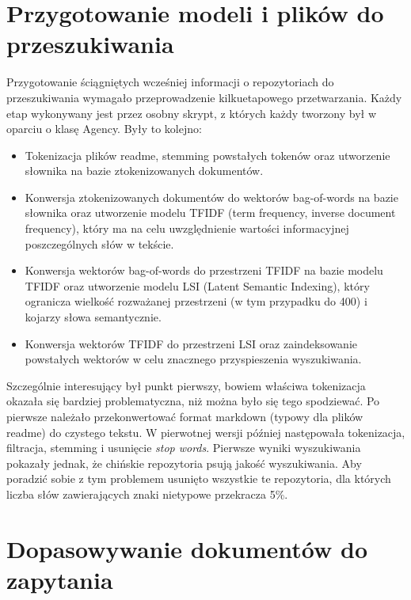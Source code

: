 \documentclass[12pt, oneside, final]{report}
\begin{document}
\section*{Przygotowanie modeli i plików do przeszukiwania}
Przygotowanie ściągniętych wcześniej informacji o repozytoriach do przeszukiwania wymagało przeprowadzenie kilkuetapowego przetwarzania. Każdy etap wykonywany jest przez osobny skrypt, z których każdy tworzony był w oparciu o klasę Agency. Były to kolejno:
\begin{itemize}
	\item{Tokenizacja plików readme, stemming powstałych tokenów oraz utworzenie słownika na bazie ztokenizowanych dokumentów.}
	\item{Konwersja ztokenizowanych dokumentów do wektorów bag-of-words na bazie słownika oraz utworzenie modelu TFIDF (term frequency, inverse document frequency), który ma na celu uwzględnienie wartości informacyjnej poszczególnych słów w tekście.}
	\item{Konwersja wektorów bag-of-words do przestrzeni TFIDF na bazie modelu TFIDF oraz utworzenie modelu LSI (Latent Semantic Indexing), który ogranicza wielkość rozważanej przestrzeni (w tym przypadku do 400) i kojarzy słowa semantycznie.}
	\item{Konwersja wektorów TFIDF do przestrzeni LSI oraz zaindeksowanie powstałych wektorów w celu znacznego przyspieszenia wyszukiwania.}
\end{itemize}

Szczególnie interesujący był punkt pierwszy, bowiem właściwa tokenizacja okazała się bardziej problematyczna, niż można było się tego spodziewać. Po pierwsze należało przekonwertować format markdown (typowy dla plików readme) do czystego tekstu. W pierwotnej wersji później następowała tokenizacja, filtracja, stemming i usunięcie \textit{stop words}. Pierwsze wyniki wyszukiwania pokazały jednak, że chińskie repozytoria psują jakość wyszukiwania. Aby poradzić sobie z tym problemem usunięto wszystkie te repozytoria, dla których liczba słów zawierających znaki nietypowe przekracza 5\%.

\section*{Dopasowywanie dokumentów do zapytania}
\end{document}
